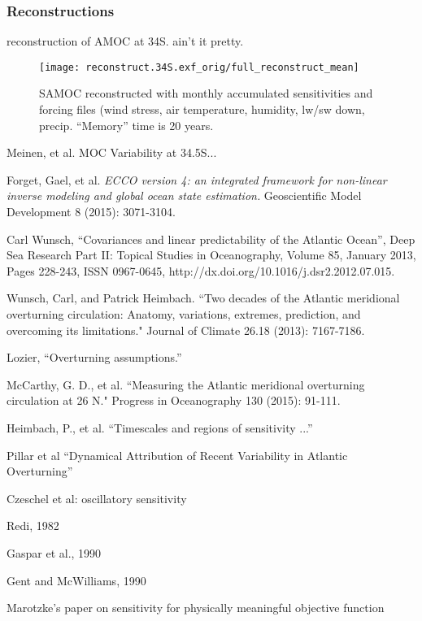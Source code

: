 \documentclass[a4paper,11pt]{article}
\begin{document}
  \subsubsection{Reconstructions}

  reconstruction of AMOC at 34S. ain't it pretty.

   \begin{figure}
    \centering
    \texttt{[image: reconstruct.34S.exf\_orig/full\_reconstruct\_mean]}
    \caption{SAMOC reconstructed with monthly accumulated sensitivities and forcing files (wind stress, air temperature, humidity, lw/sw down, precip. ``Memory'' time is 20 years.}
    \label{fig:fullReconstruction}
   \end{figure}

  
\begin{thebibliography}{3}

  Meinen, et al. MOC Variability at 34.5S...
  
  Forget, Gael, et al. \textit{ECCO version 4: an integrated framework for non-linear inverse modeling and global ocean state estimation.} Geoscientific Model Development 8 (2015): 3071-3104.
  
  Carl Wunsch, ``Covariances and linear predictability of the Atlantic Ocean'', Deep Sea Research Part II: Topical Studies in Oceanography, Volume 85, January 2013, Pages 228-243, ISSN 0967-0645, http://dx.doi.org/10.1016/j.dsr2.2012.07.015.
  
  Wunsch, Carl, and Patrick Heimbach. ``Two decades of the Atlantic meridional overturning circulation: Anatomy, variations, extremes, prediction, and overcoming its limitations." Journal of Climate 26.18 (2013): 7167-7186.
  
  Lozier, ``Overturning assumptions.'' 

  McCarthy, G. D., et al. ``Measuring the Atlantic meridional overturning circulation at 26 N." Progress in Oceanography 130 (2015): 91-111.

  Heimbach, P., et al. ``Timescales and regions of sensitivity ...''

  Pillar et al ``Dynamical Attribution of Recent Variability in Atlantic Overturning''

  Czeschel et al: oscillatory sensitivity 

  Redi, 1982

  Gaspar et al., 1990

  Gent and McWilliams, 1990

  Marotzke's paper on sensitivity for physically meaningful objective function

\end{thebibliography}
\end{document}
